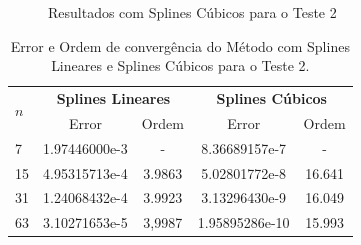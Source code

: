 \documentclass[12pt,a4paper]{report}
\begin{document}
\begin{figure}[H]
\centering
{}
\caption{Resultados com Splines Cúbicos para o Teste 2}
\end{figure}
\begin{table}[h!]
\caption{\label{tabla4} Error e Ordem de convergência do Método com Splines Lineares e Splines Cúbicos para o Teste 2.}
\centering
  \begin{tabular}{l|cc|cc}
    \hline
    \hline
    \multirow{2}{*}{\textbf{$n$}} &
      \multicolumn{2}{c}{\textbf{Splines Lineares}} &\multicolumn{2}{c}{\textbf{Splines Cúbicos}} \\
    &\multicolumn{1}{c|}{Error} & \multicolumn{1}{c|}{Ordem} & \multicolumn{1}{c|}{Error} & \multicolumn{1}{c}{Ordem}\\
    \hline
    \hline
	7   & 1.97446000e-3 & - & 8.36689157e-7  & - \\
	15 & 4.95315713e-4 & 3.9863 & 5.02801772e-8 & 16.641\\	
	31 & 1.24068432e-4 & 3.9923 & 3.13296430e-9 & 16.049\\
	63 & 3.10271653e-5 & 3,9987 & 1.95895286e-10 & 15.993\\
    \hline
    \hline
  \end{tabular}
\end{table}
\newpage
\end{document}
